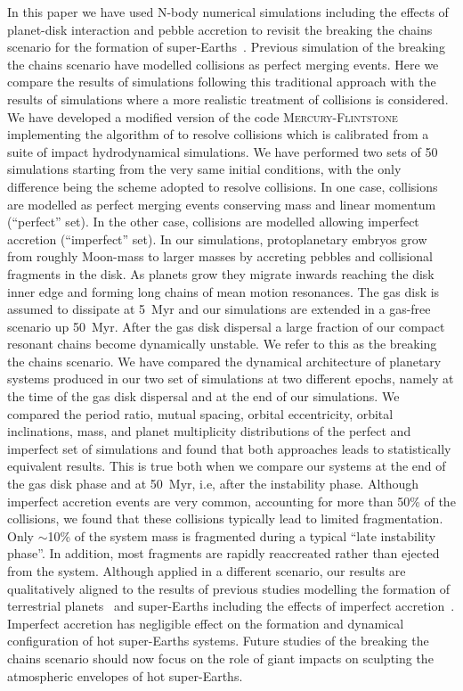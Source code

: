 \documentclass[fleqn,usenatbib]{mnras}
\begin{document}
In this paper we have used N-body numerical simulations including the effects of planet-disk interaction and pebble accretion to revisit the breaking the chains scenario for the formation of super-Earths~\citep{izidoro2017breaking,izidoro2019formation,lambrechtsetal19,carreraetal19}. Previous simulation of the breaking the chains scenario have modelled collisions as perfect merging events. Here we compare the results of simulations following this traditional approach with the results of simulations where a more realistic treatment of collisions is considered. We have developed a modified version of the code \textsc{Mercury-Flintstone}~\citep{chambers1999hybrid,izidoro2019formation} implementing the algorithm of \cite{leinhardt2012} to resolve collisions which is calibrated from a suite of impact hydrodynamical simulations. We have performed two sets of 50 simulations starting from the very same initial conditions, with the only difference being the scheme adopted to resolve collisions. In one case, collisions are modelled as perfect merging events conserving mass and linear momentum (``perfect'' set). In the other case, collisions are modelled allowing imperfect accretion (``imperfect'' set). In our simulations, protoplanetary embryos grow from roughly Moon-mass to larger masses by accreting pebbles and collisional fragments in the disk. As planets grow they migrate inwards reaching the disk inner edge and forming long chains of mean motion resonances. The gas disk is assumed to dissipate at 5~Myr and our simulations are extended in a gas-free scenario up 50~Myr. After the gas disk dispersal a large fraction of our compact resonant chains become dynamically unstable. We refer to this as the breaking the chains scenario. We have compared the dynamical architecture of planetary systems produced in our two set of simulations at two different epochs, namely at the time of the gas disk dispersal and at the end of our simulations. We compared the period ratio, mutual spacing, orbital eccentricity, orbital inclinations, mass, and planet multiplicity distributions of the perfect and imperfect set of simulations and found that both approaches leads to  statistically equivalent results. This is true both when we compare our systems at the end of the gas disk phase and at 50~Myr, i.e,  after the instability phase. Although imperfect accretion events are very common, accounting for  more than 50\% of the collisions, we found that these collisions typically lead to limited fragmentation. Only $\sim$10\% of the system mass is fragmented during a typical “late instability phase”. In addition, most fragments are rapidly reaccreated rather than ejected from the system. Although applied in a different scenario, our results are qualitatively aligned to the results of previous studies modelling the formation of terrestrial planets~\citep{kokubogenda10,chambers13,walshlevison16,deiennoetal19,walshlevison19,clementetal19} and super-Earths including the effects of imperfect accretion~\citep{poon19,scoraetal2020}. Imperfect accretion has negligible effect on the formation and dynamical configuration of hot super-Earths systems. Future studies of the breaking the chains scenario should now focus on the role of giant impacts on sculpting the atmospheric envelopes of hot super-Earths. 
\end{document}
